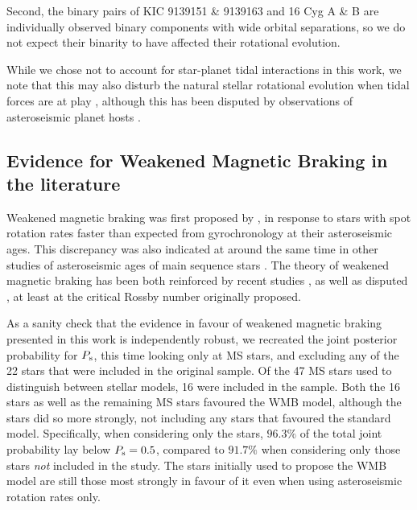 \documentclass[12pt]{article}
\begin{document}
Second, the binary pairs of KIC 9139151 \& 9139163 and 16 Cyg A \& B are individually observed binary components with wide orbital separations, so we do not expect their binarity to have affected their rotational evolution. 

While we chose not to account for star-planet tidal interactions in this work, we note that this may also disturb the natural stellar rotational evolution when tidal forces are at play \cite{maxted+2015,gallet+delorme2019, benbakoura+2019}, although this has been disputed by observations of asteroseismic planet hosts \cite{ceillier+2016}.\\

\subsection{Evidence for Weakened Magnetic Braking in the literature}
Weakened magnetic braking was first proposed by \cite{vansaders+2016}, in response to stars with spot rotation rates faster than expected from gyrochronology at their asteroseismic ages. This discrepancy was also indicated at around the same time in other studies of asteroseismic ages of main sequence stars \cite{nielsen+2015, angus+2015, davies+2015}. The theory of weakened magnetic braking has been both reinforced by recent studies \cite{metcalfe+egeland2019}, as well as disputed \cite{lorenzo-oliveira+2019}, at least at the critical Rossby number originally proposed.

As a sanity check that the evidence in favour of weakened magnetic braking presented in this work is independently robust, we recreated the joint posterior probability for $P_{\rm s}$, this time looking only at MS stars, and excluding any of the 22 stars that were included in the original \cite{vansaders+2016} sample. Of the 47 MS stars used to distinguish between stellar models, 16 were included in the \cite{vansaders+2016} sample. Both the 16 \cite{vansaders+2016} stars as well as the remaining MS stars favoured the WMB model, although the \cite{vansaders+2016} stars did so more strongly, not including any stars that favoured the standard model. Specifically, when considering only the \cite{vansaders+2016} stars, $96.3\%$ of the total joint probability lay below $P_{\rm s} = 0.5$, compared to $91.7\%$ when considering only those stars \emph{not} included in the \cite{vansaders+2016} study. The stars initially used to propose the WMB model are still those most strongly in favour of it even when using asteroseismic rotation rates only. 
\end{document}
